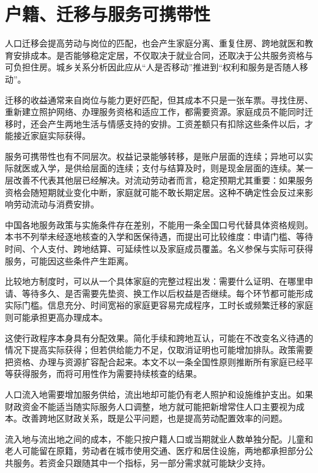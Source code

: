 \documentclass[UTF8,fontset=fandol,zihao=-4,oneside,openany]{ctexbook}
\begin{document}
\section{户籍、迁移与服务可携带性}
人口迁移会提高劳动与岗位的匹配，也会产生家庭分离、重复住房、跨地就医和教育安排成本。是否能够稳定定居，不仅取决于就业合同，还取决于公共服务资格与可负担住房。城乡关系分析因此应从“人是否移动”推进到“权利和服务是否随人移动”。

\label{arg:P147}
迁移的收益通常来自岗位与能力更好匹配，但其成本不只是一张车票。寻找住房、重新建立照护网络、办理服务资格和适应工作，都需要资源。家庭成员不能同时迁移时，还会产生两地生活与情感支持的安排。工资差额只有扣除这些条件以后，才能接近家庭实际获得。

服务可携带性也有不同层次。权益记录能够转移，是账户层面的连续；异地可以实际就医或入学，是供给层面的连续；支付与结算及时，则是现金层面的连续。某一层改善不代表其他层已经解决。对流动劳动者而言，稳定预期尤其重要：如果服务资格会随短期就业变化中断，家庭就可能不敢长期定居。这种不确定性会反过来影响劳动流动与消费安排。

中国各地服务政策与实施条件存在差别，不能用一条全国口号代替具体资格规则。本书不列举未经逐地核查的入学和医保待遇，而提出可比较维度：申请门槛、等待时间、个人支付、跨地结算、可延续性以及家庭成员覆盖。名义参保与实际可获得服务，可能因这些条件产生距离。

\label{arg:P148}
比较地方制度时，可以从一个具体家庭的完整过程出发：需要什么证明、在哪里申请、等待多久、是否需要先垫资、换工作以后权益是否继续。每个环节都可能形成实际门槛。信息充分、时间宽裕的家庭更容易完成程序，工时长或频繁迁移的家庭则可能承担更高办理成本。

这使行政程序本身具有分配效果。简化手续和跨地互认，可能在不改变名义待遇的情况下提高实际获得；但若供给能力不足，仅取消证明也可能增加排队。政策需要把资格、办理与资源扩容配合起来。本文不以一条全国性原则推断所有家庭已经平等获得服务，而将可用性作为需要持续核查的结果。

人口流入地需要增加服务供给，流出地却可能仍有老人照护和设施维护支出。如果财政资金不能适当随实际服务人口调整，地方就可能把新增常住人口主要视为成本。改善跨地区财政关系，既是公平问题，也是提高劳动配置效率的问题。

\label{arg:P149}
流入地与流出地之间的成本，不能只按户籍人口或当期就业人数单独分配。儿童和老人可能留在原籍，劳动者在城市使用交通、医疗和居住设施，两地都承担部分公共服务。若资金只跟随其中一个指标，另一部分需求就可能缺少支持。
\end{document}
